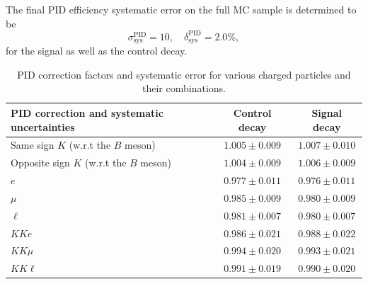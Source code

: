 The final PID efficiency systematic error on the full MC sample is determined to be
\begin{equation}
\sigma_{\mathrm{sys}}^{\mathrm{PID}} = 10,\quad \delta_{\mathrm{sys}}^{\mathrm{PID}} = 2.0\%,
\end{equation}
for the signal as well as the control decay.

\begin{table}[H]
	\centering
	\begin{tabular}{l|c|c}
		PID correction and systematic uncertainties & Control decay & Signal decay \\
		\toprule
		Same sign $K$ (w.r.t the $B$ meson) & $1.005\pm 0.009$ & $1.007\pm 0.010$\\
		Opposite sign $K$ (w.r.t the $B$ meson) & $1.004\pm 0.009$ & $1.006\pm 0.009$\\
		$e$ & $0.977\pm 0.011$ & $0.976\pm 0.011$\\
		$\mu$ & $0.985\pm 0.009$ & $0.980\pm 0.009$\\
		$\ell$ & $0.981\pm 0.007$ & $0.980\pm 0.007$\\
		\midrule
		$KKe$ & $0.986 \pm 0.021$ & $0.988\pm 0.022$\\
		$KK\mu$ & $0.994 \pm 0.020$ & $0.993\pm 0.021$\\
		\midrule
		$KK\ell$ & $0.991 \pm 0.019$ & $0.990\pm 0.020$\\
		\bottomrule
	\end{tabular}
	\captionsetup{width=0.8\linewidth}
	\caption{PID correction factors and systematic error for various charged particles and their combinations.}
	\label{tab:PID}
\end{table}

